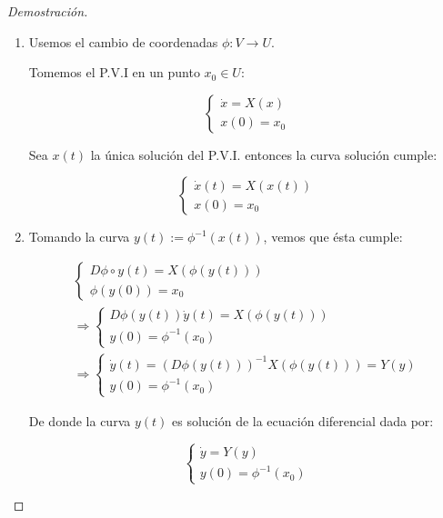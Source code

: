 \begin{proof}[Demostración]
	\begin{enumerate}
		\item Usemos el cambio de coordenadas $\phi:V\to U$. 
		
		Tomemos el P.V.I en un punto $x_0 \in U$:
		
		\begin{equation*}
			\begin{cases}
				\dot{x} = X(x) \\
				x(0) = x_0
			\end{cases}
		\end{equation*}
		
		Sea $x(t)$ la única solución del P.V.I. entonces la curva solución cumple:
		
		\begin{equation*}
			\begin{cases}
				\dot{x}(t) = X(x(t)) \\
				x(0) = x_0
			\end{cases}
		\end{equation*}
		
		\item Tomando la curva $y(t) := \phi^{-1}(x(t))$, vemos que ésta cumple:
		
		\begin{gather*}	
			\begin{cases}
				D\phi\circ y(t) = X(\phi(y(t))) \\
				\phi(y(0)) = x_0
			\end{cases} \\
			\Rightarrow \begin{cases}
				D\phi(y(t))\dot{y}(t) = X(\phi(y(t))) \\
				y(0) = \phi^{-1}(x_0)
			\end{cases}\\
			\Rightarrow \begin{cases}
				\dot{y}(t) = (D\phi(y(t)))^{-1} X(\phi(y(t))) = Y(y) \\
				y(0) = \phi^{-1}(x_0)
			\end{cases}
		\end{gather*}
		
		De donde la curva $y(t)$ es solución de la ecuación diferencial dada por:
		
		\begin{equation*}	
			\begin{cases}
				\dot{y} = Y(y) \\
				y(0) = \phi ^{-1} (x_0)
			\end{cases}
		\end{equation*}
		

\end{enumerate}
\end{proof}
